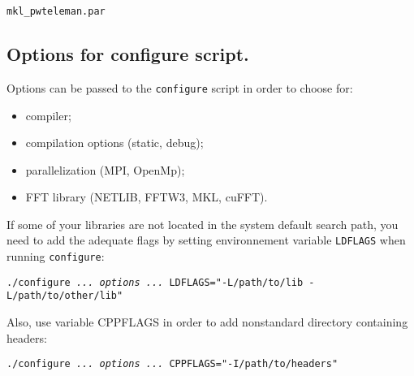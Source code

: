 \documentclass[12pt]{article}
\begin{document}
\hspace*{1cm} {\tt mkl\_pwteleman.par}

\subsection{Options for configure script.}
\label{configure-options}
Options can be passed to the {\tt configure} script in order to choose for:
\begin{itemize}
  \item compiler;
  \item compilation options (static, debug);
  \item parallelization (MPI, OpenMp);
  \item FFT library (NETLIB, FFTW3, MKL, cuFFT). 
\end{itemize}

If some of your libraries are not located in the system default search path, you need to add the adequate flags by setting environnement variable {\tt LDFLAGS} when running {\tt configure}:

\hspace*{1cm}
{\tt ./configure {\it ... options ...}  LDFLAGS="-L/path/to/lib -L/path/to/other/lib"}

Also, use variable CPPFLAGS in order to add nonstandard directory containing headers:

\hspace*{1cm}
{\tt ./configure {\it ... options ...}  CPPFLAGS="-I/path/to/headers"}
\end{document}
